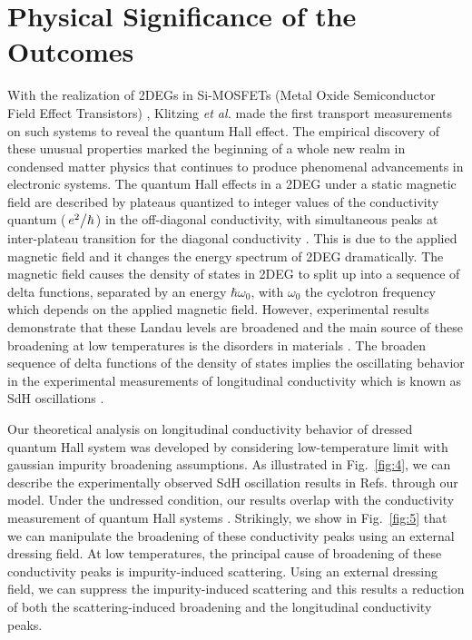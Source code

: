 \documentclass[
 reprint,
 amsmath,amssymb,
 aps,
 prb,
]{revtex4-2}
\begin{document}
{\color{Red}
\section{\label{sec:physical_significance} Physical Significance of the Outcomes}
With the realization of 2DEGs in Si-MOSFETs (Metal Oxide Semiconductor Field Effect Transistors) \citep{fowler66}, Klitzing \textit{et al.} \cite{klitzing80} made the first transport measurements on such systems to reveal the quantum Hall effect. The empirical discovery of these unusual properties marked the beginning of a whole new realm in condensed matter physics that continues to produce phenomenal advancements in electronic systems. The quantum Hall effects in a 2DEG under a static magnetic field are described by plateaus quantized to integer values of the conductivity quantum ($\flatfrac{e^2}{\hbar}$) in the off-diagonal conductivity, with simultaneous peaks at inter-plateau transition for the diagonal conductivity \cite{endo09}. This is due to the applied magnetic field and it changes the energy spectrum of 2DEG dramatically. The magnetic field causes the density of states in 2DEG to split up into a sequence of delta functions, separated by an energy $\hbar\omega_0$, with $\omega_0$ the cyclotron frequency which depends on the applied magnetic field.
However, experimental results demonstrate that these Landau levels are broadened and the main source of these broadening at low temperatures is the disorders in materials \cite{ando85,dial07}. The broaden sequence of delta functions of the density of states implies the oscillating behavior in the experimental measurements of longitudinal conductivity which is known as SdH oscillations \cite{endo09,wakabayashi78}.

Our theoretical analysis on longitudinal conductivity behavior of dressed quantum Hall system was developed by considering low-temperature limit with gaussian impurity broadening assumptions.
As illustrated in Fig.~\ref{fig:4}, we can describe the experimentally observed SdH oscillation results in Refs.\cite{endo09,wakabayashi78} through our model.
Under the undressed condition, our results overlap with the conductivity measurement of quantum Hall systems \cite{endo09}. Strikingly, we show in Fig.~\ref{fig:5} that we can manipulate the broadening of these conductivity peaks using an external dressing field. At low temperatures, the principal cause of broadening of these conductivity peaks is impurity-induced scattering. Using an external dressing field, we can suppress the impurity-induced scattering and this results a reduction of both the scattering-induced broadening and the longitudinal conductivity peaks.

}
\end{document}
